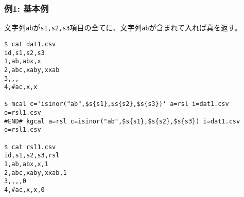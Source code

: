 
\subsubsection*{例1: 基本例}

文字列\verb|ab|が\verb|s1,s2,s3|項目の全てに、文字列\verb|ab|が含まれて入れば真を返す。

\begin{Verbatim}[baselinestretch=0.7,frame=single]
$ cat dat1.csv
id,s1,s2,s3
1,ab,abx,x
2,abc,xaby,xxab
3,,,
4,#ac,x,x

$ mcal c='isinor("ab",$s{s1},$s{s2},$s{s3})' a=rsl i=dat1.csv o=rsl1.csv
#END# kgcal a=rsl c=isinor("ab",$s{s1},$s{s2},$s{s3}) i=dat1.csv o=rsl1.csv

$ cat rsl1.csv
id,s1,s2,s3,rsl
1,ab,abx,x,1
2,abc,xaby,xxab,1
3,,,,0
4,#ac,x,x,0
\end{Verbatim}
